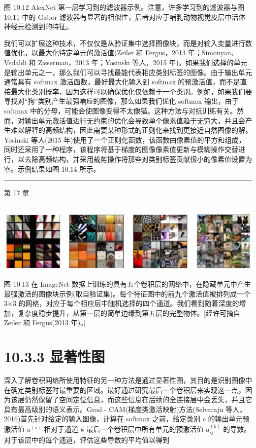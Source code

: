 \documentclass[10pt]{article}
\newcommand{\HRule}{\begin{center}\rule{0.9\linewidth}{0.2mm}\end{center}}
\begin{document}
图 10.12 AlexNet 第一层学习到的滤波器示例。注意，许多学习到的滤波器与图 10.11 中的 Gabor 滤波器有显著的相似性，后者对应于哺乳动物视觉皮层中活体神经元检测到的特征。

我们可以扩展这种技术，不仅仅是从验证集中选择图像块，而是对输入变量进行数值优化，以最大化特定单元的激活值(Zeiler 和 Fergus，2013 年；Simonyan、Vedaldi 和 Zisserman，2013 年；Yosinski 等人，2015 年)。如果我们选择的单元是输出单元之一，那么我们可以寻找最能代表相应类别标签的图像。由于输出单元通常具有 softmax 激活函数，最好最大化输入到 softmax 的预激活值，而不是直接最大化类别概率，因为这样可以确保优化仅依赖于一个类别。例如，如果我们要寻找对“狗”类别产生最强响应的图像，那么如果我们优化 softmax 输出，由于 softmax 中的分母，可能会使图像变得不太像猫。这种方法与对抗训练有关。然而，对输出单元激活值进行无约束的优化会导致单个像素值趋于无穷大，并且会产生难以解释的高频结构，因此需要某种形式的正则化来找到更接近自然图像的解。Yosinski 等人(2015 年)使用了一个正则化函数，该函数由像素值的平方和组成，同时还采用了一种程序，该程序将基于梯度的图像像素值更新与模糊操作交替进行，以去除高频结构，并采用裁剪操作将那些对类别标签贡献很小的像素值设置为零。示例结果如图 10.14 所示。

\HRule

第 17 章

\HRule

\begin{center}
\includegraphics[max width=1.0\textwidth]{images/0194e279-9b28-703a-88f4-c3ac21e2010d_324_217_404_1259_295_0.jpg}
\end{center}
\hspace*{3em} 

图 10.13 在 ImageNet 数据上训练的具有五个卷积层的网络中，在隐藏单元中产生最强激活的图像块示例(取自验证集)。每个特征图中的前九个激活值被排列成一个 3×3 的网格，对应于每个相应层中随机选择的四个通道。我们看到随着深度的增加，复杂度稳步提升，从第一层的简单边缘到第五层的完整物体。[经许可摘自 Zeiler 和 Fergus(2013 年)。]

\section*{10.3.3 显著性图}

深入了解卷积网络所使用特征的另一种方法是通过显著性图，其目的是识别图像中在确定类别标签时最重要的区域。最好通过研究最后一个卷积层来实现这一点，因为该层仍然保留了空间定位信息，而这些信息在后续的全连接层中会丢失，并且它具有最高级别的语义表示。Grad - CAM(梯度类激活映射)方法(Selvaraju 等人，2016)首先针对给定的输入图像，计算在 softmax 之前，给定类别 \(c\) 的输出单元预激活值 \({a}^{\left( c\right) }\) 相对于通道 \(k\) 最后一个卷积层中所有单元的预激活值 \({a}_{ij}^{\left( k\right) }\) 的导数。对于该层中的每个通道，评估这些导数的平均值以得到
\end{document}
